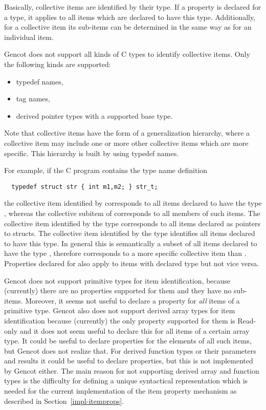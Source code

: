 Basically, collective items are identified by their type. If a property is declared for a type, it applies to 
all items which are declared to have this type. Additionally, for a collective item its sub-items can be determined
in the same way as for an individual item. 

Gencot does not support all kinds of C types to identify collective items. Only the following kinds are supported:
\begin{itemize}
\item typedef names,
\item tag names,
\item derived pointer types with a supported base type.
\end{itemize}
Note that collective items have the form of a generalization hierarchy, where a collective item may include one or 
more other collective items which are more specific. This hierarchy is built by using typedef names.

For example, if the C program contains the type name definition 
\begin{verbatim}
  typedef struct str { int m1,m2; } str_t;
\end{verbatim}
the collective item identified by  corresponds to all items declared to have the type ,
whereas the collective subitem  of  corresponds to all members  of such items. The collective
item identified by the type  corresponds to all items declared as pointers to  structs.
The collective item identified by the type  identifies all items declared to have this type. In general 
this is semantically a subset of all items declared to have the type , therefore  corresponds
to a more specific collective item than . Properties declared for  also apply to items
with declared type  but not vice versa.

Gencot does not support primitive types for item identification, because (currently) there are no properties supported
for them and they have no sub-items. Moreover, it seems not useful to declare a property for \textit{all} items of
a primitive type. Gencot also does not support derived array types for item identification because (currently) the only 
property supported for them is Read-only and it does not seem useful to declare this for all items of a certain array 
type. It could be useful to declare properties for the elements of all such items, but Gencot does not realize that.
For derived function types or their parameters and results it could be useful to declare properties, but this is not
implemented by Gencot either. The main reason for not supporting derived array and function types is the difficulty
for defining a unique syntactical representation which is needed for the current implementation of the item property
mechanism as described in Section~\ref{impl-itemprops}.

